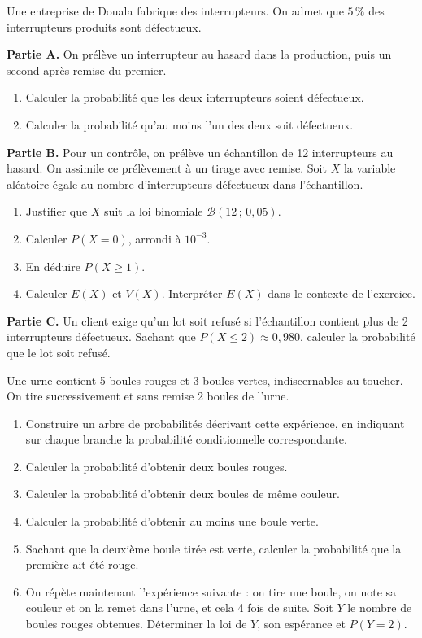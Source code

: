\documentclass[11pt]{article}
\begin{document}
\begin{exercice}
Une entreprise de Douala fabrique des interrupteurs. On admet que $5\,\%$ des interrupteurs produits sont défectueux.

\textbf{Partie A.} On prélève un interrupteur au hasard dans la production, puis un second après remise du premier.
\begin{enumerate}
\item Calculer la probabilité que les deux interrupteurs soient défectueux.
\item Calculer la probabilité qu'au moins l'un des deux soit défectueux.
\end{enumerate}

\textbf{Partie B.} Pour un contrôle, on prélève un échantillon de 12 interrupteurs au hasard. On assimile ce prélèvement à un tirage avec remise. Soit $X$ la variable aléatoire égale au nombre d'interrupteurs défectueux dans l'échantillon.
\begin{enumerate}
\item Justifier que $X$ suit la loi binomiale $\mathcal{B}(12\,;\,0,05)$.
\item Calculer $P(X=0)$, arrondi à $10^{-3}$.
\item En déduire $P(X\geq 1)$.
\item Calculer $E(X)$ et $V(X)$. Interpréter $E(X)$ dans le contexte de l'exercice.
\end{enumerate}

\textbf{Partie C.} Un client exige qu'un lot soit refusé si l'échantillon contient plus de 2 interrupteurs défectueux. Sachant que $P(X\leq 2)\approx 0,980$, calculer la probabilité que le lot soit refusé.
\end{exercice}

\begin{exercice}
Une urne contient 5 boules rouges et 3 boules vertes, indiscernables au toucher. On tire successivement et sans remise 2 boules de l'urne.
\begin{enumerate}
\item Construire un arbre de probabilités décrivant cette expérience, en indiquant sur chaque branche la probabilité conditionnelle correspondante.
\item Calculer la probabilité d'obtenir deux boules rouges.
\item Calculer la probabilité d'obtenir deux boules de même couleur.
\item Calculer la probabilité d'obtenir au moins une boule verte.
\item Sachant que la deuxième boule tirée est verte, calculer la probabilité que la première ait été rouge.
\item On répète maintenant l'expérience suivante : on tire une boule, on note sa couleur et on la remet dans l'urne, et cela 4 fois de suite. Soit $Y$ le nombre de boules rouges obtenues. Déterminer la loi de $Y$, son espérance et $P(Y=2)$.
\end{enumerate}
\end{exercice}
\end{document}
